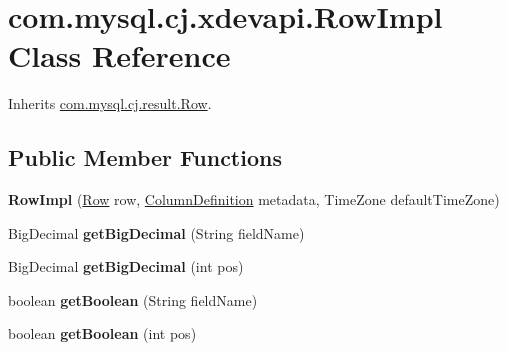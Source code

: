 \hypertarget{classcom_1_1mysql_1_1cj_1_1xdevapi_1_1_row_impl}{}\section{com.\+mysql.\+cj.\+xdevapi.\+Row\+Impl Class Reference}
\label{classcom_1_1mysql_1_1cj_1_1xdevapi_1_1_row_impl}


Inherits \mbox{\hyperlink{interfacecom_1_1mysql_1_1cj_1_1result_1_1_row}{com.\+mysql.\+cj.\+result.\+Row}}.

\subsection*{Public Member Functions}
\begin{DoxyCompactItemize}
\item 
\mbox{\label{classcom_1_1mysql_1_1cj_1_1xdevapi_1_1_row_impl_af687747767168ead978243dd23987353}} 
{\bfseries Row\+Impl} (\mbox{\hyperlink{interfacecom_1_1mysql_1_1cj_1_1result_1_1_row}{Row}} row, \mbox{\hyperlink{interfacecom_1_1mysql_1_1cj_1_1protocol_1_1_column_definition}{Column\+Definition}} metadata, Time\+Zone default\+Time\+Zone)
\item 
\mbox{\label{classcom_1_1mysql_1_1cj_1_1xdevapi_1_1_row_impl_ada7aa558c2ae857cf3f7b62dbc3b9fd0}} 
Big\+Decimal {\bfseries get\+Big\+Decimal} (String field\+Name)
\item 
\mbox{\label{classcom_1_1mysql_1_1cj_1_1xdevapi_1_1_row_impl_a3be4b63b81ed1911bab3bfb4376a4662}} 
Big\+Decimal {\bfseries get\+Big\+Decimal} (int pos)
\item 
\mbox{\label{classcom_1_1mysql_1_1cj_1_1xdevapi_1_1_row_impl_ab013f9d30898e83321c1b61172af8812}} 
boolean {\bfseries get\+Boolean} (String field\+Name)
\item 
\mbox{\label{classcom_1_1mysql_1_1cj_1_1xdevapi_1_1_row_impl_a415a6a966e27fae2aa8e3ba29ce5bba1}} 
boolean {\bfseries get\+Boolean} (int pos)
\item 
\mbox{\label{classcom_1_1mysql_1_1cj_1_1xdevapi_1_1_row_impl_af5e187068279df915587e8efa9b9a556}} 

\end{DoxyCompactItemize}
